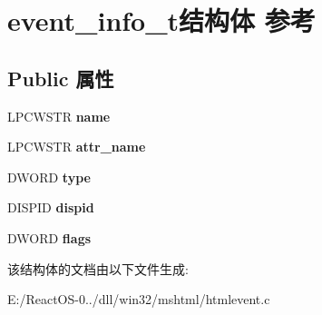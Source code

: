 \hypertarget{structevent__info__t}{}\section{event\+\_\+info\+\_\+t结构体 参考}
\label{structevent__info__t}
\subsection*{Public 属性}
\begin{DoxyCompactItemize}
\item 
\mbox{\label{structevent__info__t_a8f9fa9223f88dda0b1a6a60d6bb8fa21}} 
L\+P\+C\+W\+S\+TR {\bfseries name}
\item 
\mbox{\label{structevent__info__t_a3f8cecff000911243f94537508d13230}} 
L\+P\+C\+W\+S\+TR {\bfseries attr\+\_\+name}
\item 
\mbox{\label{structevent__info__t_a2fa75b76a0ccd048fc9ac4a1a491ed16}} 
D\+W\+O\+RD {\bfseries type}
\item 
\mbox{\label{structevent__info__t_a739fedf9047e66790efe9fe0c87e9249}} 
D\+I\+S\+P\+ID {\bfseries dispid}
\item 
\mbox{\label{structevent__info__t_a4f00cb5797b86b9551b198b035ec06ab}} 
D\+W\+O\+RD {\bfseries flags}
\end{DoxyCompactItemize}


该结构体的文档由以下文件生成\+:\begin{DoxyCompactItemize}
\item 
E\+:/\+React\+O\+S-\/0../dll/win32/mshtml/htmlevent.\+c\end{DoxyCompactItemize}
